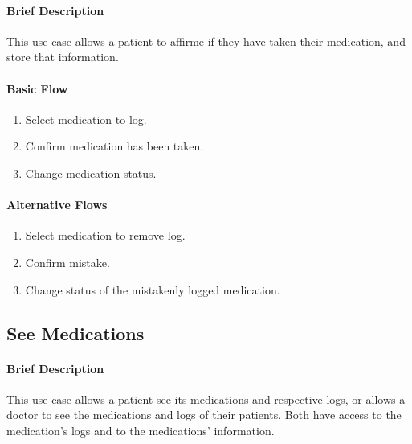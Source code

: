 \documentclass{report}
\begin{document}
\paragraph{Brief Description}
This use case allows a patient to affirme if they have taken their medication, and store that information.

\begin{multicols}{2}
    \paragraph{Basic Flow}
    \begin{enumerate}
        \item Select medication to log.
        \item Confirm medication has been taken.
        \item Change medication status.
    \end{enumerate}
    \columnbreak

    \paragraph{Alternative Flows}
    \begin{enumerate}[label=A\arabic*.]
        \item Select medication to remove log.
        \item Confirm mistake.
        \item Change status of the mistakenly logged medication.
    \end{enumerate}
\end{multicols}

\vspace{1em}
\subsection{See Medications}
\paragraph{Brief Description}
This use case allows a patient see its medications and respective logs, or allows a doctor to see the medications and logs of their patients.
Both have access to the medication's logs and to the medications' information.
\end{document}
